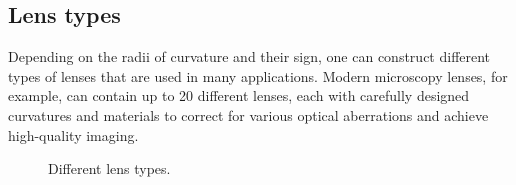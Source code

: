 \documentclass[
  a4paper,
]{book}
\begin{document}
\subsection{Lens types}\label{lens-types}

Depending on the radii of curvature and their sign, one can construct
different types of lenses that are used in many applications. Modern
microscopy lenses, for example, can contain up to 20 different lenses,
each with carefully designed curvatures and materials to correct for
various optical aberrations and achieve high-quality imaging.

\begin{figure}


\caption{\label{fig-lens-types}Different lens types.}

\end{figure}%
\end{document}
